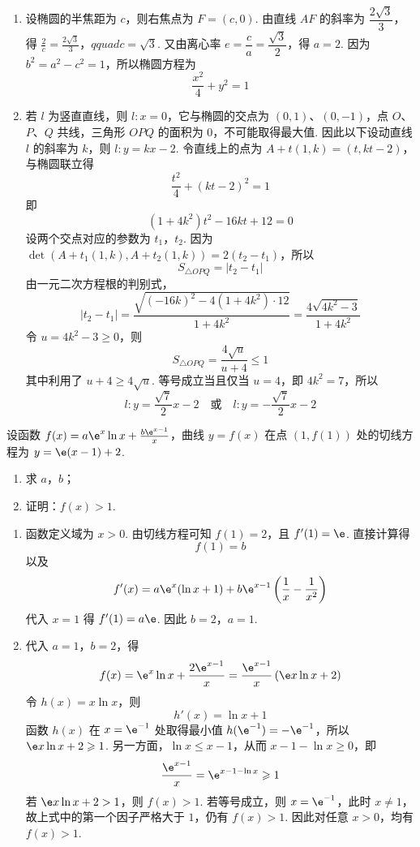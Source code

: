 \begin{solution}
\begin{enumerate}
\item 设椭圆的半焦距为 \(c\)，则右焦点为 \(F=(c,0)\). 由直线 \(AF\) 的斜率为
\(\dfrac{2\sqrt3}{3}\)，得
\(\frac{2}{c}=\frac{2\sqrt3}{3}\)，\(qquad c=\sqrt3\).
又由离心率 \(e=\dfrac ca=\dfrac{\sqrt3}{2}\)，得 \(a=2\). 因为
\(b^2=a^2-c^2=1\)，所以椭圆方程为
\[
\frac{x^2}{4}+y^2=1
\]

\item 若 \(l\) 为竖直直线，则 \(l:x=0\)，它与椭圆的交点为
\((0,1)\)、\((0,-1)\)，点 \(O\)、\(P\)、\(Q\) 共线，三角形 \(OPQ\) 的面积为 \(0\)，不可能取得最大值.
因此以下设动直线 \(l\) 的斜率为 \(k\)，则 \(l:y=kx-2\). 令直线上的点为
\(A+t(1,k)=(t,kt-2)\)，与椭圆联立得
\[
\frac{t^2}{4}+(kt-2)^2=1
\]
即
\[
(1+4k^2)t^2-16kt+12=0
\]
设两个交点对应的参数为 \(t_1\)，\(t_2\). 因为
\(\det(A+t_1(1,k),A+t_2(1,k))=2(t_2-t_1)\)，所以
\[
S_{\triangle OPQ}=|t_2-t_1|
\]
由一元二次方程根的判别式，
\[
|t_2-t_1|=\frac{\sqrt{(-16k)^2-4(1+4k^2)\cdot12}}{1+4k^2}
 =\frac{4\sqrt{4k^2-3}}{1+4k^2}
\]
令 \(u=4k^2-3\geqslant0\)，则
\[
S_{\triangle OPQ}=\frac{4\sqrt u}{u+4}\leqslant1
\]
其中利用了 \(u+4\geqslant4\sqrt u\). 等号成立当且仅当 \(u=4\)，即
\(4k^2=7\)，所以
\[
l:y=\frac{\sqrt7}{2}x-2
\quad\text{或}\quad
l:y=-\frac{\sqrt7}{2}x-2
\]
\end{enumerate}
\end{solution}

\begin{problem}
设函数 \( f(x) = a \e^{x} \ln x + \frac{b \e^{x-1}}{x} \)，曲线 \( y = f(x) \) 在点 \( (1, f(1)) \) 处的切线方程为 \( y = \e(x - 1) + 2 \).

\begin{enumerate}
\item 求 \(a\)，\(b\)；
\item 证明：\(f(x) > 1\).
\end{enumerate}
\end{problem}

\begin{solution}
\begin{enumerate}
\item 函数定义域为 \(x>0\). 由切线方程可知
\(f(1)=2\)，且 \(f'(1)=\e\). 直接计算得
\[
f(1)=b
\]
以及
\[
f'(x)=a\e^x(\ln x+1)+b\e^{x-1}\left(\frac1x-\frac1{x^2}\right)
\]
代入 \(x=1\) 得 \(f'(1)=a\e\).
因此 \(b=2\)，\(a=1\).

\item 代入 \(a=1\)，\(b=2\)，得
\[
f(x)=\e^x\ln x+\frac{2\e^{x-1}}x
 =\frac{\e^{x-1}}x\left(\e x\ln x+2\right)
\]
令 \(h(x)=x\ln x\)，则
\[
h'(x)=\ln x+1
\]
函数 \(h(x)\) 在 \(x=\e^{-1}\) 处取得最小值
\(h(\e^{-1})=-\e^{-1}\)，所以
\(\e x\ln x+2\geqslant1\). 另一方面，\(\ln x\leqslant x-1\)，从而
\(x-1-\ln x\geqslant0\)，即
\[
\frac{\e^{x-1}}x=\e^{x-1-\ln x}\geqslant1
\]
若 \(\e x\ln x+2>1\)，则 \(f(x)>1\). 若等号成立，则
\(x=\e^{-1}\)，此时 \(x\ne1\)，故上式中的第一个因子严格大于 \(1\)，仍有
\(f(x)>1\). 因此对任意 \(x>0\)，均有 \(f(x)>1\).
\end{enumerate}
\end{solution}

